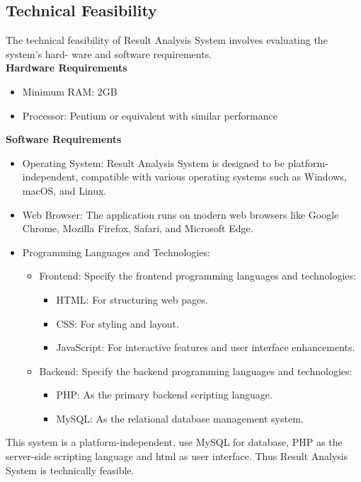 \documentclass{nascproject}
\begin{document}
    \subsection {Technical Feasibility}
    The technical feasibility of Result Analysis System involves evaluating the system’s hard-
    ware and software requirements.\\
    
    \textbf{Hardware Requirements}
    \begin{itemize}
    	\item  Minimum RAM: 2GB
    	\item Processor: Pentium or equivalent with similar performance
    \end{itemize}
   
    
    \textbf{Software Requirements}
    \begin{itemize}
    	\item Operating System: Result Analysis System is designed to be platform-independent,
    	compatible with various operating systems such as Windows, macOS, and
    	Linux.
    	\item  Web Browser: The application runs on modern web browsers like Google
    	Chrome, Mozilla Firefox, Safari, and Microsoft Edge.
    	\item Programming Languages and Technologies:
    	\begin{itemize}
    		\item 	Frontend: Specify the frontend programming languages and technologies:
    		\begin{itemize}
    			\item HTML: For structuring web pages.
    			\item CSS: For styling and layout.
    			\item 	JavaScript: For interactive features and user interface enhancements.
    		\end{itemize}
    		\item 	Backend: Specify the backend programming languages and technologies:
    		\begin{itemize}
    			\item PHP: As the primary backend scripting language.
    			\item 	MySQL: As the relational database management system.
    		\end{itemize}
    	\end{itemize}	
   \end{itemize}
This system is a platform-independent, use MySQL for database, PHP as the server-side scripting language and html as user interface. Thus Result Analysis System is technically feasible.	
\end{document}
